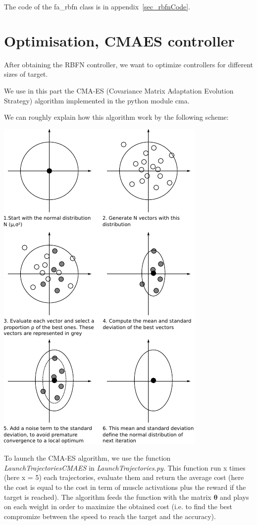 \documentclass[pdftex,a4paper,11pt]{report}
\begin{document}
The code of the fa\_rbfn class is in appendix~\ref{sec_rbfnCode}.

\section{Optimisation, CMAES controller}
After obtaining the RBFN controller, we want to optimize controllers for different sizes of target.

We use in this part the CMA-ES (Covariance Matrix Adaptation Evolution Strategy) algorithm implemented in the python module cma.

We can roughly explain how this algorithm work by the following scheme:
\begin{center}
\includegraphics[scale=1.5]{figures/cross-entropy.pdf}
\end{center}
To launch the CMA-ES algorithm, we use the function \textit{LaunchTrajectoriesCMAES} in \textit{LaunchTrajectories.py}. This function run x times (here x = 5) each trajectories, evaluate them and return the average cost (here the cost is equal to the cost in term of muscle activations plus the reward if the target is reached). The algorithm feeds the function with the matrix $\boldsymbol{\theta}$ and plays on each weight in order to maximize the obtained cost (i.e. to find the best compromize between the speed to reach the target and the accuracy).
\end{document}
